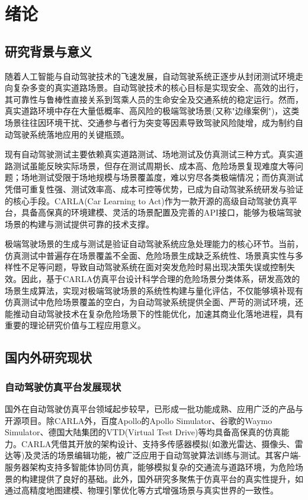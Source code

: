 \section{绪论}

\subsection{研究背景与意义}
随着人工智能与自动驾驶技术的飞速发展，自动驾驶系统正逐步从封闭测试环境走向复杂多变的真实道路场景。自动驾驶技术的核心目标是实现安全、高效的出行，其可靠性与鲁棒性直接关系到驾乘人员的生命安全及交通系统的稳定运行。然而，真实道路环境中存在大量低概率、高风险的极端驾驶场景(又称"边缘案例")，这类场景往往因环境干扰、交通参与者行为突变等因素导致驾驶风险陡增，成为制约自动驾驶系统落地应用的关键瓶颈。

现有自动驾驶测试主要依赖真实道路测试、场地测试及仿真测试三种方式。真实道路测试虽能反映实际场景，但存在测试周期长、成本高、危险场景复现难度大等问题；场地测试受限于场地规模与场景覆盖度，难以穷尽各类极端情况；而仿真测试凭借可重复性强、测试效率高、成本可控等优势，已成为自动驾驶系统研发与验证的核心手段。CARLA(Car Learning to Act)作为一款开源的高级自动驾驶仿真平台，具备高保真的环境建模、灵活的场景配置及完善的API接口，能够为极端驾驶场景的构建与测试提供可靠的技术支撑。

极端驾驶场景的生成与测试是验证自动驾驶系统应急处理能力的核心环节。当前，仿真测试中普遍存在场景覆盖不全面、危险场景生成缺乏系统性、场景真实性与多样性不足等问题，导致自动驾驶系统在面对突发危险时易出现决策失误或控制失效。因此，基于CARLA仿真平台设计科学合理的危险场景分类体系，研发高效的场景生成算法，实现对极端驾驶场景的系统性构建与量化评估，不仅能够填补现有仿真测试中危险场景覆盖的空白，为自动驾驶系统提供全面、严苛的测试环境，还能推动自动驾驶技术在复杂危险场景下的性能优化，加速其商业化落地进程，具有重要的理论研究价值与工程应用意义。

\subsection{国内外研究现状}

\subsubsection{自动驾驶仿真平台发展现状}
国外在自动驾驶仿真平台领域起步较早，已形成一批功能成熟、应用广泛的产品与开源项目。除CARLA外，百度Apollo的Apollo Simulator、谷歌的Waymo Simulator、德国大陆集团的VTD(Virtual Test Drive)等均具备高保真的仿真能力。CARLA凭借其开放的架构设计、支持多传感器模拟(如激光雷达、摄像头、雷达等)及灵活的场景编辑功能，被广泛应用于自动驾驶算法训练与测试。其客户端-服务器架构支持多智能体协同仿真，能够模拟复杂的交通流与道路环境，为危险场景的构建提供了良好的基础。此外，国外研究多聚焦于仿真平台的真实性提升，如通过高精度地图建模、物理引擎优化等方式增强场景与真实世界的一致性。

